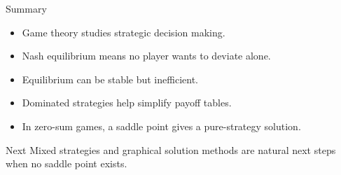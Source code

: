 \documentclass[10pt,aspectratio=169]{beamer}
\begin{document}
\begin{frame}{Summary}
\begin{itemize}
  \item Game theory studies strategic decision making.
  \item Nash equilibrium means no player wants to deviate alone.
  \item Equilibrium can be stable but inefficient.
  \item Dominated strategies help simplify payoff tables.
  \item In zero-sum games, a saddle point gives a pure-strategy solution.
\end{itemize}
\vspace{0.3cm}
\begin{block}{Next}
Mixed strategies and graphical solution methods are natural next steps when no saddle point exists.
\end{block}
\end{frame}
\end{document}
